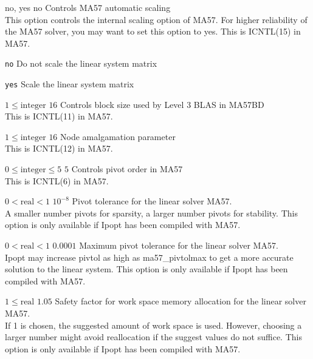 %
{\ttfamily no, yes}%
{no}%
{Controls MA57 automatic scaling\\
This option controls the internal scaling option of MA57. For higher reliability of the MA57 solver, you may want to set this option to yes. This is ICNTL(15) in MA57.}%
{\begin{list}{}{
\setlength{\parsep}{0em}
\setlength{\leftmargin}{5ex}
\setlength{\labelwidth}{2ex}
\setlength{\itemindent}{0ex}
\setlength{\topsep}{0pt}}
\item[\texttt{no}] Do not scale the linear system matrix
\item[\texttt{yes}] Scale the linear system matrix
\end{list}
}

%
{$1\leq\textrm{integer}$}%
{$16$}%
{Controls block size used by Level 3 BLAS in MA57BD\\
This is ICNTL(11) in MA57.}%
{}

%
{$1\leq\textrm{integer}$}%
{$16$}%
{Node amalgamation parameter\\
This is ICNTL(12) in MA57.}%
{}

%
{$0\leq\textrm{integer}\leq5$}%
{$5$}%
{Controls pivot order in MA57\\
This is ICNTL(6) in MA57.}%
{}

%
{$0<\textrm{real}<1$}%
{$10^{- 8}$}%
{Pivot tolerance for the linear solver MA57.\\
A smaller number pivots for sparsity, a larger number pivots for stability. This option is only available if Ipopt has been compiled with MA57.}%
{}

%
{$0<\textrm{real}<1$}%
{$0.0001$}%
{Maximum pivot tolerance for the linear solver MA57.\\
Ipopt may increase pivtol as high as ma57\_pivtolmax to get a more accurate solution to the linear system.  This option is only available if Ipopt has been compiled with MA57.}%
{}

%
{$1\leq\textrm{real}$}%
{$1.05$}%
{Safety factor for work space memory allocation for the linear solver MA57.\\
If 1 is chosen, the suggested amount of work space is used.  However, choosing a larger number might avoid reallocation if the suggest values do not suffice.  This option is only available if Ipopt has been compiled with MA57.}%
{}

